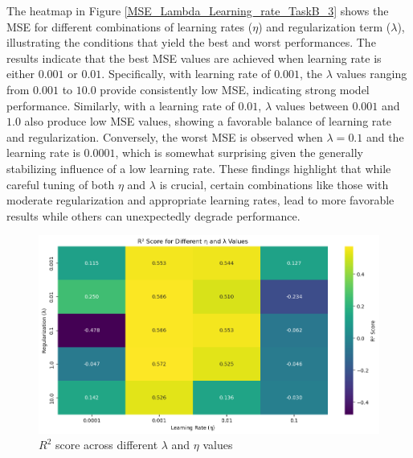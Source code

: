 \documentclass{article}
\newcommand{\0}{\mathbf{0}}
\newcommand{\1}{\mathbf{1}}
\begin{document}
The heatmap in Figure \ref{MSE_Lambda_Learning_rate_TaskB_3} shows the MSE for different combinations of learning rates (\(\eta\)) and regularization term (\(\lambda\)), illustrating the conditions that yield the best and worst performances. The results indicate that the best MSE values are achieved when learning rate is either \(0.001\) or \(0.01\). Specifically, with learning rate of \(0.001\), the \(\lambda\) values ranging from \(0.001\) to \(10.0\) provide consistently low MSE, indicating strong model performance. Similarly, with a learning rate of \(0.01\), \(\lambda\) values between \(0.001\) and \(1.0\) also produce low MSE values, showing a favorable balance of learning rate and regularization. Conversely, the worst MSE is observed when \(\lambda = 0.1\) and the learning rate is \(0.0001\), which is somewhat surprising given the generally stabilizing influence of a low learning rate. These findings highlight that while careful tuning of both \(\eta\) and \(\lambda\) is crucial, certain combinations like those with moderate regularization and appropriate learning rates, lead to more favorable results while others can unexpectedly degrade performance.


\begin{figure}[h!]
    \centering
    \includegraphics[width=0.9\linewidth]{R2_Score_Lambda_LearningRate_TaskB_4.png}
    \caption{\(R^2\) score across different \(\lambda\) and \(\eta\) values}
    \label{R2_Score_Lambda_LearningRate_TaskB_4}
\end{figure}
\end{document}
